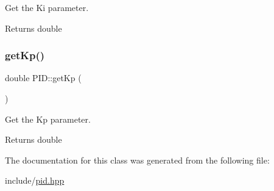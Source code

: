 Get the Ki parameter. 

\begin{DoxyReturn}{Returns}
double 
\end{DoxyReturn}
\mbox{\label{classPID_a52625de61b1b2977b2c26ddb2698f14e}} 
\subsubsection{\texorpdfstring{get\+Kp()}{getKp()}}
{\footnotesize\ttfamily double P\+I\+D\+::get\+Kp (\begin{DoxyParamCaption}{ }\end{DoxyParamCaption})}



Get the Kp parameter. 

\begin{DoxyReturn}{Returns}
double 
\end{DoxyReturn}


The documentation for this class was generated from the following file\+:\begin{DoxyCompactItemize}
\item 
include/\hyperlink{pid_8hpp}{pid.\+hpp}\end{DoxyCompactItemize}
